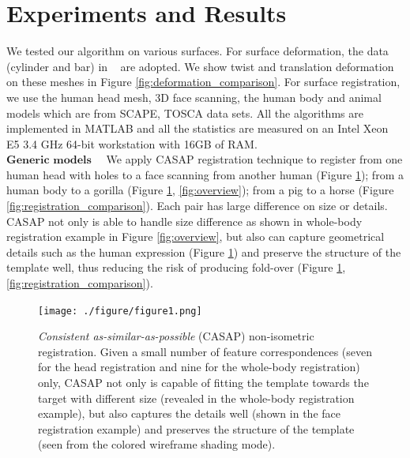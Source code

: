 \section{Experiments and Results}
We tested our algorithm on various surfaces. For surface deformation, the data (cylinder and bar) in ~\citep{botsch2008linear} are adopted. We show twist and translation deformation on these meshes in Figure \ref{fig:deformation_comparison}. For surface registration, we use the human head mesh, 3D face scanning, the human body and animal models which are from SCAPE, TOSCA data sets. All the algorithms are implemented in MATLAB and all the statistics are measured on an Intel Xeon E5 3.4 GHz 64-bit workstation with 16GB of RAM. \\

$\textbf{Generic models}$ ~~We apply CASAP registration technique to register from one human head with holes to a face scanning from another human (Figure \ref{fig:1}); from a human body to a gorilla (Figure \ref{fig:1}, \ref{fig:overview}); from a pig to a horse (Figure \ref{fig:registration_comparison}). Each pair has large difference on size or details. CASAP not only is able to handle size difference as shown in whole-body registration example in Figure \ref{fig:overview}, but also can capture geometrical details such as the human expression (Figure \ref{fig:1}) and preserve the structure of the template well, thus reducing the risk of producing fold-over (Figure \ref{fig:1}, \ref{fig:registration_comparison}).\\

\begin{figure}[ht]
\begin{center}
\texttt{[image: ./figure/figure1.png]}
\end{center}
\caption{\emph{Consistent as-similar-as-possible} (CASAP) non-isometric registration. Given a small number of feature correspondences (seven for the head registration and nine for the whole-body registration) only, CASAP not only is capable of fitting the template towards the target with different size (revealed in the whole-body registration example), but also captures the details well (shown in the face registration example) and preserves the structure of the template (seen from the colored wireframe shading mode).}
\label{fig:1}
\end{figure}


